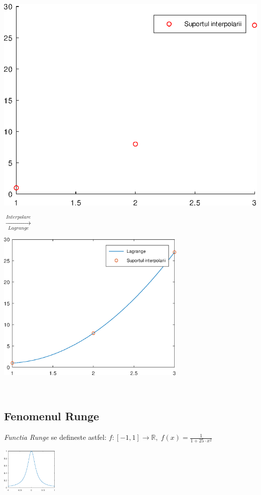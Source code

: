\documentclass{article}
\begin{document}
\begin{minipage}{0.4\textwidth}
    \includegraphics[width=1\textwidth]{scatter_ex}
\end{minipage}
{\LARGE$\xrightarrow[Lagrange]{Interpolare}$}\;\;
\begin{minipage}{0.6\textwidth}
    \includegraphics[width=0.68\textwidth]{lagrange_ex}
\end{minipage}\\


\subsection{Fenomenul Runge}
\tab \textit{Functia Runge}\framebox[0.3cm][r]{\footnotemark} se defineste astfel: $f:[-1,1]\rightarrow\mathbb{R},\; f(x) = \frac{1}{1 + 25 \cdot x^2}$
\begin{center}
    \includegraphics[width=0.2\textwidth]{runge_function}
\end{center}
\end{document}
